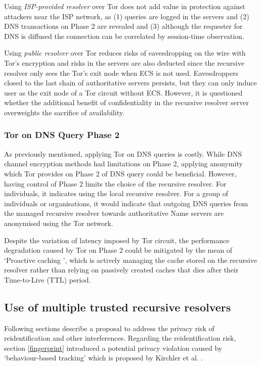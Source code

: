 Using \textit{ISP-provided resolver} over Tor does not add value in protection against attackers near the ISP network, as (1) queries are logged in the servers and (2) DNS transactions on Phase 2 are revealed and (3) although the requester for DNS is diffused the connection can be correlated by session-time observation.

Using \textit{public resolver} over Tor reduces risks of eavesdropping on the wire with Tor's encryption and risks in the servers are also deducted since the recursive resolver only sees the Tor's exit node when ECS is not used.
Eavesdroppers closed to the last chain of authoritative servers persists, but they can only induce user as the exit node of a Tor circuit without ECS.
However, it is questioned whether the additional benefit of confidentiality in the recursive resolver server overweights the sacrifice of availability.

\subsubsection{Tor on DNS Query Phase 2}
As previously mentioned, applying Tor on DNS queries is costly.
While DNS channel encryption methods had limitations on Phase 2, applying anonymity which Tor provides on Phase 2 of DNS query could be beneficial.
However, having control of Phase 2 limits the choice of the recursive resolver.
For individuals, it indicates using the local recursive resolver.
For a group of individuals or organisations, it would indicate that outgoing DNS queries from the managed recursive resolver towards authoritative Name servers are anonymised using the Tor network.

Despite the variation of latency imposed by Tor circuit, the performance degradation caused by Tor on Phase 2 could be mitigated by the mean of `Proactive caching \cite{cohen2003proactive}', which is actively managing the cache stored on the recursive resolver rather than relying on passively created caches that dies after their Time-to-Live (TTL) period.

\subsection{Use of multiple trusted recursive resolvers}
Following sections describe a proposal to address the privacy risk of reidentification and other interferences.
Regarding the reidentification risk, section \ref{fingerprint} introduced a potential privacy violation caused by `behaviour-based tracking' which is proposed by Kirchler et al. \cite{kirchler2016tracked}.

